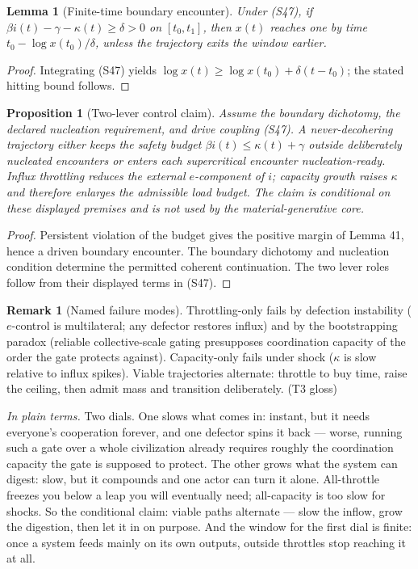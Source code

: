 \documentclass[11pt]{article}
\newtheorem{proposition}{Proposition}
\newtheorem{lemma}{Lemma}
\theoremstyle{definition}
\newtheorem{remark}{Remark}
\newcommand{\plainterms}{\emph{In plain terms.}}
\begin{document}
\begin{lemma}[Finite-time boundary encounter]
Under (S47), if $\beta i(t) - \gamma - \kappa(t) \geq \delta > 0$ on $[t_0, t_1]$, then $x(t)$ reaches one by time $t_0 - \log x(t_0)/\delta$, unless the trajectory exits the window earlier.
\end{lemma}

\begin{proof}
Integrating (S47) yields $\log x(t) \geq \log x(t_0) + \delta(t - t_0)$; the stated hitting bound follows.
\end{proof}

\begin{proposition}[Two-lever control claim]
Assume the boundary dichotomy, the declared nucleation requirement, and drive coupling (S47). A never-decohering trajectory either keeps the safety budget $\beta i(t) \leq \kappa(t) + \gamma$ outside deliberately nucleated encounters or enters each supercritical encounter nucleation-ready. Influx throttling reduces the external $e$-component of $i$; capacity growth raises $\kappa$ and therefore enlarges the admissible load budget. The claim is conditional on these displayed premises and is not used by the material-generative core.
\end{proposition}

\begin{proof}
Persistent violation of the budget gives the positive margin of Lemma 41, hence a driven boundary encounter. The boundary dichotomy and nucleation condition determine the permitted coherent continuation. The two lever roles follow from their displayed terms in (S47).
\end{proof}

\begin{remark}[Named failure modes]
Throttling-only fails by defection instability ($e$-control is multilateral; any defector restores influx) and by the bootstrapping paradox (reliable collective-scale gating presupposes coordination capacity of the order the gate protects against). Capacity-only fails under shock ($\kappa$ is slow relative to influx spikes). Viable trajectories alternate: throttle to buy time, raise the ceiling, then admit mass and transition deliberately. (T3 gloss)
\end{remark}

\noindent\plainterms{} Two dials. One slows what comes in: instant, but it needs everyone's cooperation forever, and one defector spins it back --- worse, running such a gate over a whole civilization already requires roughly the coordination capacity the gate is supposed to protect. The other grows what the system can digest: slow, but it compounds and one actor can turn it alone. All-throttle freezes you below a leap you will eventually need; all-capacity is too slow for shocks. So the conditional claim: viable paths alternate --- slow the inflow, grow the digestion, then let it in on purpose. And the window for the first dial is finite: once a system feeds mainly on its own outputs, outside throttles stop reaching it at all.
\end{document}
